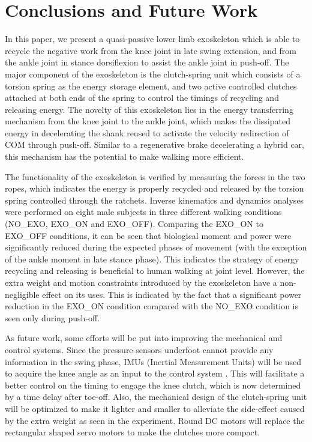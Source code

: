\documentclass[twocolumn,cleanfoot,10pt]{asme2ej}
\begin{document}
\section{Conclusions and Future Work}
\label{sec:discussion}
In this paper, we present a quasi-passive lower limb exoskeleton which is able to recycle the negative work from the knee joint in late swing extension, and from the ankle joint in stance dorsiflexion to assist the ankle joint in push-off.
The major component of the exoskeleton is the clutch-spring unit which consists of a torsion spring as the energy storage element, and two active controlled clutches attached at both ends of the spring to control the timings of recycling and releasing energy.
The novelty of this exoskeleton lies in the energy transferring mechanism from the knee joint to the ankle joint, which makes the dissipated energy in decelerating the shank reused to activate the velocity redirection of COM through push-off.
Similar to a regenerative brake decelerating a hybrid car, this mechanism has the potential to make walking more efficient.

The functionality of the exoskeleton is verified by measuring the forces in the two ropes, which indicates the energy is properly recycled and released by the torsion spring controlled through the ratchets.
Inverse kinematics and dynamics analyses were performed on eight male subjects in three different walking conditions (NO\_EXO, EXO\_ON and EXO\_OFF).
Comparing the EXO\_ON to EXO\_OFF conditions, it can be seen that biological moment and power were significantly reduced during the expected phases of movement (with the exception of the ankle moment in late stance phase).
This indicates the strategy of energy recycling and releasing is beneficial to human walking at joint level.
However, the extra weight and motion constraints introduced by the exoskeleton have a non-negligible effect on its uses.
This is indicated by the fact that a significant power reduction in the EXO\_ON condition compared with the NO\_EXO condition is seen only during push-off.

As future work, some efforts will be put into improving the mechanical and control systems.
Since the pressure sensors underfoot cannot provide any information in the swing phase, IMUs (Inertial Measurement Units) will be used to acquire the knee angle as an input to the control system \cite{IMU2}.
This will facilitate a better control on the timing to engage the knee clutch, which is now determined by a time delay after toe-off.
Also, the mechanical design of the clutch-spring unit will be optimized to make it lighter and smaller to alleviate the side-effect caused by the extra weight as seen in the experiment.
Round DC motors will replace the rectangular shaped servo motors to make the clutches more compact. 
\end{document}
